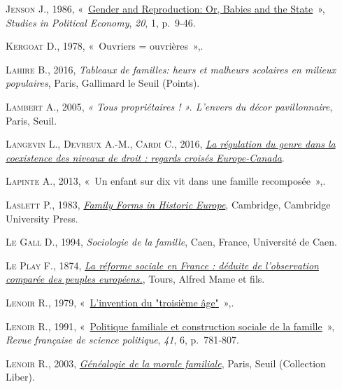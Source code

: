 \documentclass[
  12pt,
]{book}
\newlength{\cslhangindent}
\newenvironment{CSLReferences}[2] %
 {\begin{list}{}{%
  \setlength{\itemindent}{0pt}
  \setlength{\leftmargin}{0pt}
  \setlength{\parsep}{0pt}
  \ifodd #1
   \setlength{\leftmargin}{\cslhangindent}
   \setlength{\itemindent}{-1\cslhangindent}
  \fi
  \setlength{\itemsep}{#2\baselineskip}}}
 {\end{list}}
\begin{document}
\begin{CSLReferences}{0}{1}
\textsc{Jenson J.}, 1986,
{«~\href{https://doi.org/10.1080/19187033.1986.11675588}{Gender and
Reproduction: Or, Babies and the State}~»}, \emph{Studies in Political
Economy}, \emph{20}, 1, p.~9‑46.

\textsc{Kergoat D.}, 1978, {«~Ouvriers = ouvrières~»},.

\textsc{Lahire B.}, 2016, \emph{Tableaux de familles: heurs et malheurs
scolaires en milieux populaires}, Paris, Gallimard le Seuil (Points).

\textsc{Lambert A.}, 2005, \emph{« Tous propriétaires ! ». L{'}envers du
décor pavillonnaire}, Paris, Seuil.

\textsc{Langevin L.}, \textsc{Devreux A.-M.}, \textsc{Cardi C.}, 2016,
\emph{\href{https://utpjournals.press/doi/10.3138/cjwl.28.3.ix}{La
régulation du genre dans la coexistence des niveaux de droit : regards
croisés Europe-Canada}}.

\textsc{Lapinte A.}, 2013, {«~Un enfant sur dix vit dans une famille
recomposée~»},.

\textsc{Laslett P.}, 1983,
\emph{\href{https://doi.org/10.1017/CBO9780511897535}{Family Forms in
Historic Europe}}, Cambridge, Cambridge University Press.

\textsc{Le Gall D.}, 1994, \emph{Sociologie de la famille}, Caen,
France, Université de Caen.

\textsc{Le Play F.}, 1874,
\emph{\href{https://gallica.bnf.fr/ark:/12148/bpt6k209942s}{La réforme
sociale en France : déduite de l'observation comparée des peuples
européens.}}, Tours, Alfred Mame et fils.

\textsc{Lenoir R.}, 1979,
{«~\href{https://doi.org/10.3406/arss.1979.2630}{L'invention du
{"}troisième âge{"}}~»},.

\textsc{Lenoir R.}, 1991,
{«~\href{https://doi.org/10.3406/rfsp.1991.394601}{Politique familiale
et construction sociale de la famille}~»}, \emph{Revue française de
science politique}, \emph{41}, 6, p.~781‑807.

\textsc{Lenoir R.}, 2003,
\emph{\href{http://banq.pretnumerique.ca/accueil/isbn/9782021009064}{Généalogie
de la morale familiale}}, Paris, Seuil (Collection Liber).


\end{CSLReferences}
\end{document}

